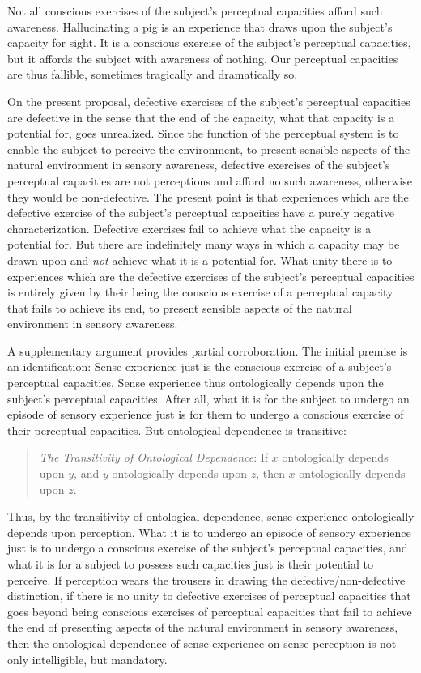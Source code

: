 \documentclass[12pt]{article}
\begin{document}
Not all conscious exercises of the subject's perceptual capacities afford such awareness. Hallucinating a pig is an experience that draws upon the subject's capacity for sight. It is a conscious exercise of the subject's perceptual capacities, but it affords the subject with awareness of nothing. Our perceptual capacities are thus fallible, sometimes tragically and dramatically so. 

On the present proposal, defective exercises of the subject's perceptual capacities are defective in the sense that the end of the capacity, what that capacity is a potential for, goes unrealized. Since the function of the perceptual system is to enable the subject to perceive the environment, to present sensible aspects of the natural environment in sensory awareness, defective exercises of the subject's perceptual capacities are not perceptions and afford no such awareness, otherwise they would be non-defective. The present point is that experiences which are the defective exercise of the subject's perceptual capacities have a purely negative characterization. Defective exercises fail to achieve what the capacity is a potential for. But there are indefinitely many ways in which a capacity may be drawn upon and \emph{not} achieve what it is a potential for. What unity there is to experiences which are the defective exercises of the subject's perceptual capacities is entirely given by their being the conscious exercise of a perceptual capacity that fails to achieve its end, to present sensible aspects of the natural environment in sensory awareness. 

A supplementary argument provides partial corroboration. The initial premise is an identification: Sense experience just is the conscious exercise of a subject's perceptual capacities. Sense experience thus ontologically depends upon the subject's perceptual capacities. After all, what it is for the subject to undergo an episode of sensory experience just is for them to undergo a conscious exercise of their perceptual capacities. But ontological dependence is transitive: 
\begin{quote}
	\emph{The Transitivity of Ontological Dependence}: If \( x \) ontologically depends upon \( y \), and \( y \) ontologically depends upon \( z \), then \( x \) ontologically depends upon \( z \). 
\end{quote}
Thus, by the transitivity of ontological dependence, sense experience ontologically depends upon perception. What it is to undergo an episode of sensory experience just is to undergo a conscious exercise of the subject's perceptual capacities, and what it is for a subject to possess such capacities just is their potential to perceive. If perception wears the trousers in drawing the defective/non-defective distinction, if there is no unity to defective exercises of perceptual capacities that goes beyond being conscious exercises of perceptual capacities that fail to achieve the end of presenting aspects of the natural environment in sensory awareness, then the ontological dependence of sense experience on sense perception is not only intelligible, but mandatory.
\end{document}
